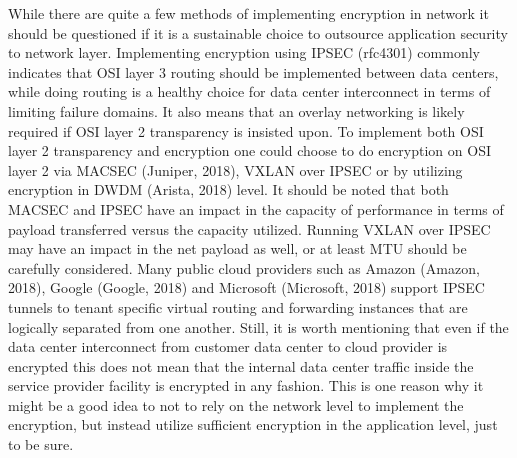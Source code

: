 \documentclass{article}
\begin{document}
While there are quite a few methods of implementing encryption in network it should be questioned if it is a sustainable choice to outsource application security to network layer. Implementing encryption using IPSEC (rfc4301) commonly indicates that OSI layer 3 routing should be implemented between data centers, while doing routing is a healthy choice for data center interconnect in terms of limiting failure domains. It also means that an overlay networking is likely required if OSI layer 2 transparency is insisted upon. To implement both OSI layer 2 transparency and encryption one could choose to do encryption on OSI layer 2 via MACSEC (Juniper, 2018), VXLAN over IPSEC or by utilizing encryption in DWDM (Arista, 2018) level. It should be noted that both MACSEC and IPSEC have an impact in the capacity of performance in terms of payload transferred versus the capacity utilized. Running VXLAN over IPSEC may have an impact in the net payload as well, or at least MTU should be carefully considered. Many public cloud providers such as Amazon (Amazon, 2018), Google (Google, 2018) and Microsoft (Microsoft, 2018) support IPSEC tunnels to tenant specific virtual routing and forwarding instances that are logically separated from one another. Still, it is worth mentioning that even if the data center interconnect from customer data center to cloud provider is encrypted this does not mean that the internal data center traffic inside the service provider facility is encrypted in any fashion. This is one reason why it might be a good idea to not to rely on the network level to implement the encryption, but instead utilize sufficient encryption in the application level, just to be sure.
\end{document}
